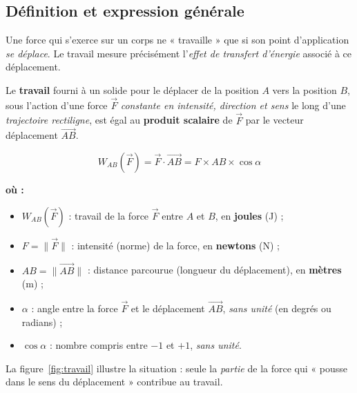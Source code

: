 \documentclass[11pt,a4paper]{article}
\newenvironment{ou}{%
  \par\smallskip\noindent\textbf{où :}\nopagebreak
  \begin{itemize}[leftmargin=1.8em,topsep=2pt,itemsep=1.5pt,parsep=0pt]}%
  {\end{itemize}}
\newcommand{\vv}[1]{\vec{#1}}
\begin{document}
\subsection{Définition et expression générale}

Une force qui s'exerce sur un corps ne « travaille » que si son point d'application
\emph{se déplace}. Le travail mesure précisément l'\emph{effet de transfert d'énergie} associé
à ce déplacement.

\begin{definition}
Le \textbf{travail} fourni à un solide pour le déplacer de la position $A$ vers la position $B$,
sous l'action d'une force $\vv F$ \emph{constante en intensité, direction et sens} le long d'une
\emph{trajectoire rectiligne}, est égal au \textbf{produit scalaire} de $\vv F$ par le vecteur
déplacement $\vv{AB}$.
\end{definition}

\begin{formule}
\[
\boxed{\;W_{AB}(\vv F)=\vv F\cdot\vv{AB}=F\times AB\times\cos\alpha\;}
\]
\begin{ou}
  \item $W_{AB}(\vv F)$ : travail de la force $\vv F$ entre $A$ et $B$, en \textbf{joules} (\si{\joule}) ;
  \item $F=\lVert\vv F\rVert$ : intensité (norme) de la force, en \textbf{newtons} (\si{\newton}) ;
  \item $AB=\lVert\vv{AB}\rVert$ : distance parcourue (longueur du déplacement), en \textbf{mètres} (\si{\metre}) ;
  \item $\alpha$ : angle entre la force $\vv F$ et le déplacement $\vv{AB}$, \emph{sans unité} (en degrés ou radians) ;
  \item $\cos\alpha$ : nombre compris entre $-1$ et $+1$, \emph{sans unité}.
\end{ou}
\end{formule}

\noindent La figure~\ref{fig:travail} illustre la situation : seule la \emph{partie} de la force
qui « pousse dans le sens du déplacement » contribue au travail.
\end{document}
